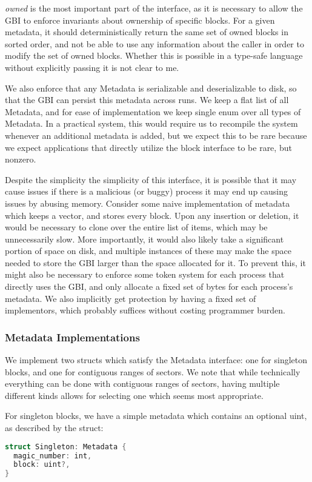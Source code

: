 \documentclass[letterpaper,twocolumn,10pt]{article}
\begin{document}
\textit{owned} is the most important part of the interface, as it is necessary to allow the GBI
to enforce invariants about ownership of specific blocks. For a given metadata, it should
deterministically return the same set of owned blocks in sorted order, and not be able to use
any information about the caller in order to modify the set of owned blocks. Whether this is
possible in a type-safe language without explicitly passing it is not clear to me.

We also enforce that any Metadata is serializable and deserializable to disk, so that the GBI
can persist this metadata across runs. We keep a flat list of all Metadata, and for ease of
implementation we keep single enum over all types of Metadata. In a practical system, this would
require us to recompile the system whenever an additional metadata is added, but we expect this
to be rare because we expect applications that directly utilize the block interface to be rare,
but nonzero.

Despite the simplicity the simplicity of this interface, it is possible that it may
cause issues if there is a malicious (or buggy) process it may end up causing issues by abusing
memory. Consider some naive implementation of metadata which keeps a vector, and stores
every block. Upon any insertion or deletion, it would be necessary to clone over the entire list
of items, which may be unnecessarily slow. More importantly, it would also likely take a
significant portion of space on disk, and multiple instances of these may make the space needed
to store the GBI larger than the space allocated for it. To prevent this, it might also be
necessary to enforce some token system for each process that directly uses the GBI, and only
allocate a fixed set of bytes for each process's metadata. We also implicitly get protection by
having a fixed set of implementors, which probably suffices without costing programmer burden.

\subsubsection{Metadata Implementations}

We implement two structs which satisfy the Metadata interface: one for singleton blocks,
and one for contiguous ranges of sectors. We note that while technically everything can be done
with contiguous ranges of sectors, having multiple different kinds allows for selecting one
which seems most appropriate.

For singleton blocks, we have a simple metadata which contains an optional uint, as
described by the struct:
\begin{lstlisting}[language=rust, basicstyle=\small]
struct Singleton: Metadata {
  magic_number: int,
  block: uint?,
}
\end{lstlisting}
\end{document}

